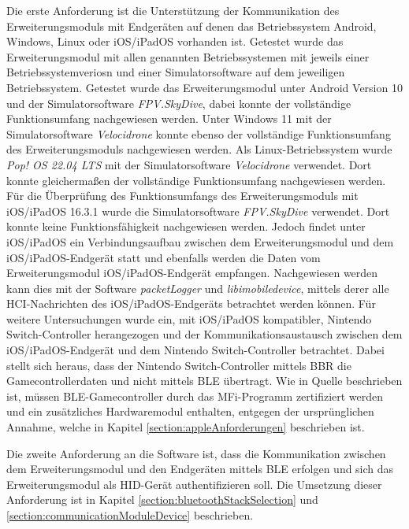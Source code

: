 Die erste Anforderung ist die Unterstützung der Kommunikation des Erweiterungsmoduls mit Endgeräten auf denen das Betriebssystem Android, Windows, Linux oder iOS/iPadOS vorhanden ist. Getestet wurde das Erweiterungsmodul mit allen genannten Betriebssystemen mit jeweils einer Betriebssystemveriosn und einer Simulatorsoftware auf dem jeweiligen Betriebssystem. Getestet wurde das Erweiterungsmodul unter Android Version 10 und der Simulatorsoftware \textit{FPV.SkyDive}, dabei konnte der vollständige Funktionsumfang nachgewiesen werden. Unter Windows 11 mit der Simulatorsoftware \textit{Velocidrone} konnte ebenso der vollständige Funktionsumfang des Erweiterungsmoduls nachgewiesen werden. Als Linux-Betriebssystem wurde \textit{Pop! OS 22.04 LTS} mit der Simulatorsoftware \textit{Velocidrone} verwendet. Dort konnte gleichermaßen der vollständige Funktionsumfang nachgewiesen werden. Für die Überprüfung des Funktionsumfangs des Erweiterungsmoduls mit iOS/iPadOS 16.3.1 wurde die Simulatorsoftware \textit{FPV.SkyDive} verwendet. Dort konnte keine Funktionsfähigkeit nachgewiesen werden. Jedoch findet unter iOS/iPadOS ein Verbindungsaufbau zwischen dem Erweiterungsmodul und dem iOS/iPadOS-Endgerät statt und ebenfalls werden die Daten vom Erweiterungsmodul iOS/iPadOS-Endgerät empfangen. Nachgewiesen werden kann dies mit der Software \textit{packetLogger} und \textit{libimobiledevice}, mittels derer alle \ac{HCI}-Nachrichten des iOS/iPadOS-Endgeräts betrachtet werden können. Für weitere Untersuchungen wurde ein, mit iOS/iPadOS kompatibler, Nintendo Switch-Controller herangezogen und der Kommunikationsaustausch zwischen dem iOS/iPadOS-Endgerät und dem Nintendo Switch-Controller betrachtet. Dabei stellt sich heraus, dass der Nintendo Switch-Controller mittels \ac{BBR} die Gamecontrollerdaten und nicht mittels \ac{BLE} übertragt. Wie in Quelle \cite{lemmingDevESP32Comment} beschrieben ist, müssen \ac{BLE}-Gamecontroller durch das \ac{MFi}-Programm zertifiziert werden und ein zusätzliches Hardwaremodul enthalten, entgegen der ursprünglichen Annahme, welche in Kapitel \ref{section:appleAnforderungen} beschrieben ist.

Die zweite Anforderung an die Software ist, dass die Kommunikation zwischen dem Erweiterungsmodul und den Endgeräten mittels \ac{BLE} erfolgen und sich das Erweiterungsmodul als \ac{HID}-Gerät authentifizieren soll. Die Umsetzung dieser Anforderung ist in Kapitel \ref{section:bluetoothStackSelection} und \ref{section:communicationModuleDevice} beschrieben.

